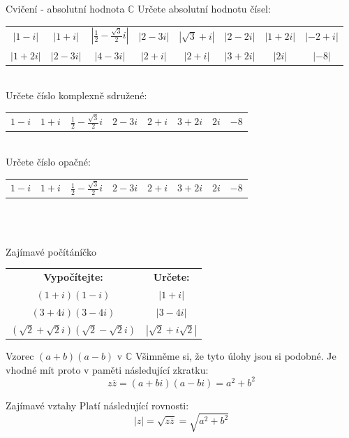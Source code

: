 \documentclass[aspectratio=169]{beamer} %
\newcommand{\C}{$\mathbb{C}$}
\newcommand{\reseni}[1]{\ \hfill \hyperlink{#1}{\beamergotobutton{\Large Řešení}}}
\begin{document}
 \begin{frame}[label=C2]{Cvičení - absolutní hodnota \C}
	Určete absolutní hodnotu čísel: \\
	\begin{tabular}{cccccccc}
	$|1-i|$ & $|1+i|$ & $\left|\frac{1}{2}-\frac{\sqrt{3}}{2}i\right|$ & $|2-3i|$ & $|\sqrt{3}+i|$ & $|2-2i|$ & $|1+2i|$ & $|-2+i|$\\
	$|1+2i|$ & $|2-3i|$ & $|4-3i|$ & $|2+i|$ & $|2+i|$ & $|3+2i|$ & $|2i|$ & $|-8|$ \\
	\end{tabular} \\[2ex]
	Určete číslo komplexně sdružené: 
	\begin{tabular}{cccccccc}
	$1-i$ & $1+i$ & $\frac{1}{2}-\frac{\sqrt{3}}{2}i$ & $2-3i$ & $2+i$ & $3+2i$ & $2i$ & $-8$ \\
	\end{tabular} \\[2ex]
	Určete číslo opačné: \\
	\begin{tabular}{cccccccc}
	$1-i$ & $1+i$ & $\frac{1}{2}-\frac{\sqrt{3}}{2}i$ & $2-3i$ & $2+i$ & $3+2i$ & $2i$ & $-8$ \\
	\end{tabular} \\
	\reseni{Ř2}
	\end{frame}
	
	\begin{frame}{Zajímavé počítáníčko}
	 \begin{minipage}{0.5\textwidth}
	  \begin{tabular}{cc}
	  \textbf{Vypočítejte:} & \textbf{Určete:} \\
	   $(1+i)(1-i)$ & $|1+i|$ \\
	   $(3+4i)(3-4i)$ & $|3-4i|$ \\
	   $(\sqrt{2}+\sqrt{2}i)(\sqrt{2}-\sqrt{2}i)$ & $|\sqrt{2}+i\sqrt{2}|$ 
	  \end{tabular}
	 \end{minipage} \vspace{4ex}
	 \begin{minipage}{0.42\textwidth}
	  \begin{alertblock}{Vzorec $(a+b)(a-b)$ v \C}
	  Všimněme si, že tyto úlohy jsou si podobné. Je vhodné mít proto v paměti následující zkratku: $$z\overline{z}=(a+bi)(a-bi)=a^2+b^2$$ 
	  \end{alertblock}
	 \end{minipage}
	 \begin{alertblock}{Zajímavé vztahy}
	 Platí následující rovnosti: $$|z|=\sqrt{z\overline{z}}=\sqrt{a^2+b^2}$$
	 \end{alertblock}
	\end{frame}
	
\end{document}
